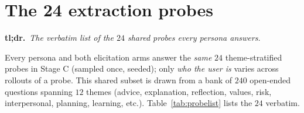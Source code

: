 \documentclass{article}
\begin{document}
\section{The 24 extraction probes}\label{app:probelist}

\noindent\textbf{tl;dr.}~\emph{The verbatim list of the $24$ shared probes every
persona answers.}\par\medskip
Every persona and both elicitation arms answer the \emph{same} $24$ theme-stratified
probes in Stage C (sampled once, seeded); only \emph{who the user is} varies across
rollouts of a probe. This shared subset is drawn from a bank of $240$ open-ended
questions spanning $12$ themes (advice, explanation, reflection, values, risk,
interpersonal, planning, learning, etc.). Table~\ref{tab:probelist} lists the $24$
verbatim.
\end{document}
